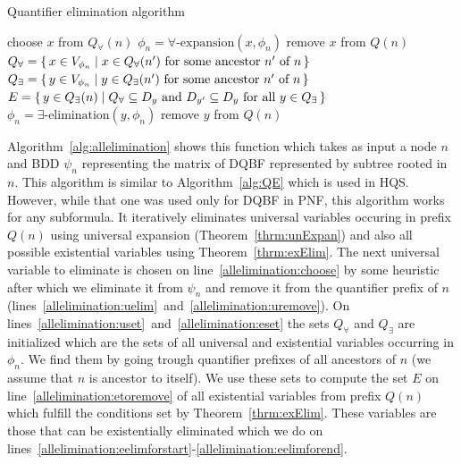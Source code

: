 \documentclass[
  digital, %
  color,
  twoside, %
  table,   %
  nolof,     %
  nolot,     %
]{fithesis3}
\let\setbuilder\set
\newcommand{\simpleset}[1]{\{{#1}\}}
\renewcommand{\set}[1]{\normalexpandarg\IfSubStr{#1}{|}{\setbuilder{#1}}{\simpleset{#1}}}
\theoremstyle{definition}
\theoremstyle{remark}
\newcommand{\vars}[1]{V_{#1}}
\newcommand{\prefix}[1]{Q({#1})}
\newcommand{\eprefix}[1]{Q_{\exists}(#1)}
\newcommand{\uprefix}[1]{Q_{\forall}(#1)}
\begin{document}
\begin{algorithm}
  \caption{Quantifier elimination algorithm}
  \label{alg:allelimination}
  \begin{algorithmic}[1]
      \While{$\uprefix{n}$ is not empty}%
        \State choose $x$ from $\uprefix{n}$\label{allelimination:choose}
        \State $\phi_n = \forall\text{-expansion}(x,\phi_n)$ \label{allelimination:uelim}
        \State remove $x$ from $\prefix{n}$\label{allelimination:uremove}
        \State $Q_{\forall} = \set{x \in \vars{\phi_n} | x \in \uprefix{n'} \text{ for some ancestor } n' \text{ of } n}$\label{allelimination:uset}
        \State $Q_{\exists} = \set{y \in \vars{\phi_n} | y \in \eprefix{n'} \text{ for some ancestor } n' \text{ of } n}$\label{allelimination:eset}
        \State $E = \set{y \in \eprefix{n} | Q_{\forall} \subseteq D_y \text{ and } D_{y'} \subseteq D_y \text{ for all } y \in Q_{\exists}}$\label{allelimination:etoremove}
        \label{allelimination:eelimforstart}
          \State $\phi_n = \exists\text{-elimination}(y,\phi_n)$\label{allelimination:eelim}
          \State remove $y$ from $\prefix{n}$\label{allelimination:eremove}
        \EndFor\label{allelimination:eelimforend}
      \EndWhile
    \EndFunction
  \end{algorithmic}
\end{algorithm}

Algorithm~\ref{alg:allelimination} shows this function which takes as input a node $n$ and BDD $\psi_n$ representing the matrix of DQBF represented by subtree rooted in $n$. This algorithm is similar to Algorithm~\ref{alg:QE} which is used in HQS. However, while that one was used only for DQBF in PNF, this algorithm works for any subformula. It iteratively eliminates universal variables occuring in prefix $\prefix{n}$ using universal expansion (Theorem~\ref{thrm:unExpan}) and also all possible existential variables using Theorem~\ref{thrm:exElim}. The next universal variable to eliminate is chosen on line~\ref{allelimination:choose} by some heuristic after which we eliminate it from $\psi_n$ and remove it from the quantifier prefix of $n$ (lines~\ref{allelimination:uelim}~and~\ref{allelimination:uremove}). On lines~\ref{allelimination:uset}~and~\ref{allelimination:eset} the sets $Q_{\forall}$ and $Q_{\exists}$ are initialized which are the sets of all universal and existential variables occurring in $\phi_n$. We find them by going trough quantifier prefixes of all ancestors of $n$ (we assume that $n$ is ancestor to itself). We use these sets to compute the set $E$ on line~\ref{allelimination:etoremove} of all existential variables from prefix $\prefix{n}$ which fulfill the conditions set by Theorem~\ref{thrm:exElim}. These variables are those that can be existentially eliminated which we do on lines~\ref{allelimination:eelimforstart}-\ref{allelimination:eelimforend}.
\end{document}
